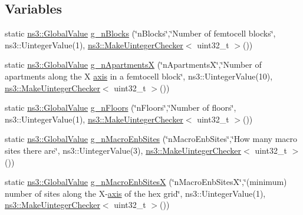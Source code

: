 \subsection*{Variables}
\begin{DoxyCompactItemize}
\item 
static \hyperlink{classns3_1_1GlobalValue}{ns3\+::\+Global\+Value} \hyperlink{lena-dual-stripe_8cc_a24d1b790d687653b3cae54a6242a7b22}{g\+\_\+n\+Blocks} (\char`\"{}n\+Blocks\char`\"{},\char`\"{}Number of femtocell blocks\char`\"{}, ns3\+::\+Uinteger\+Value(1), \hyperlink{namespacens3_aed274764da411ed9397a3524a7c9abb8}{ns3\+::\+Make\+Uinteger\+Checker}$<$ uint32\+\_\+t $>$())
\item 
static \hyperlink{classns3_1_1GlobalValue}{ns3\+::\+Global\+Value} \hyperlink{lena-dual-stripe_8cc_a491818f72e50f3c52632374aa402e712}{g\+\_\+n\+ApartmentsX} (\char`\"{}n\+ApartmentsX\char`\"{},\char`\"{}Number of apartments along the X \hyperlink{lte__ue__measurements_8m_a66e0b8c0128c6e65aef94eff49b3130d}{axis} in a femtocell block\char`\"{}, ns3\+::\+Uinteger\+Value(10), \hyperlink{namespacens3_aed274764da411ed9397a3524a7c9abb8}{ns3\+::\+Make\+Uinteger\+Checker}$<$ uint32\+\_\+t $>$())
\item 
static \hyperlink{classns3_1_1GlobalValue}{ns3\+::\+Global\+Value} \hyperlink{lena-dual-stripe_8cc_aff6a8c68afd9f992c5e6069ad2787e19}{g\+\_\+n\+Floors} (\char`\"{}n\+Floors\char`\"{},\char`\"{}Number of floors\char`\"{}, ns3\+::\+Uinteger\+Value(1), \hyperlink{namespacens3_aed274764da411ed9397a3524a7c9abb8}{ns3\+::\+Make\+Uinteger\+Checker}$<$ uint32\+\_\+t $>$())
\item 
static \hyperlink{classns3_1_1GlobalValue}{ns3\+::\+Global\+Value} \hyperlink{lena-dual-stripe_8cc_aca10e2f6779d3bd951248066f84bae18}{g\+\_\+n\+Macro\+Enb\+Sites} (\char`\"{}n\+Macro\+Enb\+Sites\char`\"{},\char`\"{}How many macro sites there are\char`\"{}, ns3\+::\+Uinteger\+Value(3), \hyperlink{namespacens3_aed274764da411ed9397a3524a7c9abb8}{ns3\+::\+Make\+Uinteger\+Checker}$<$ uint32\+\_\+t $>$())
\item 
static \hyperlink{classns3_1_1GlobalValue}{ns3\+::\+Global\+Value} \hyperlink{lena-dual-stripe_8cc_a4eb44b2b92a09e112cfa7798c7569725}{g\+\_\+n\+Macro\+Enb\+SitesX} (\char`\"{}n\+Macro\+Enb\+SitesX\char`\"{},\char`\"{}(minimum) number of sites along the X-\/\hyperlink{lte__ue__measurements_8m_a66e0b8c0128c6e65aef94eff49b3130d}{axis} of the hex grid\char`\"{}, ns3\+::\+Uinteger\+Value(1), \hyperlink{namespacens3_aed274764da411ed9397a3524a7c9abb8}{ns3\+::\+Make\+Uinteger\+Checker}$<$ uint32\+\_\+t $>$())

\end{DoxyCompactItemize}
